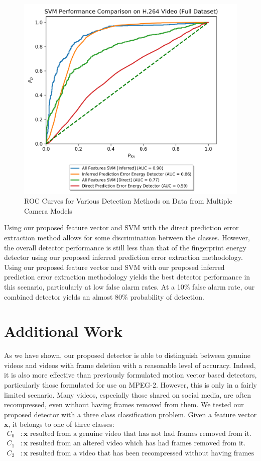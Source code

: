 \begin{figure}[htbp]
\centerline{\includegraphics[width=0.7\linewidth]{ExperimentalResults/full_ds_compare_roc.png}}
\caption{ROC Curves for Various Detection Methods on Data from Multiple Camera Models}
\label{fullDSSVM}
\end{figure}

Using our proposed feature vector and SVM with the direct prediction error extraction method allows for some discrimination between the classes. However, the overall detector performance is still less than that of the fingerprint energy detector using our proposed inferred prediction error extraction methodology. Using our proposed feature vector and SVM with our proposed inferred prediction error extraction methodology yields the best detector performance in this scenario, particularly at low false alarm rates. At a 10\% false alarm rate, our combined detector yields an almost 80\% probability of detection.

\section{Additional Work}

As we have shown, our proposed detector is able to distinguish between genuine videos and videos with frame deletion with a reasonable level of accuracy. Indeed, it is also more effective than previously formulated motion vector based detectors, particularly those formulated for use on MPEG-2. However, this is only in a fairly limited scenario. Many videos, especially those shared on social media, are often recompressed, even without having frames removed from them. We tested our proposed detector with a three class classification problem. Given a feature vector $\bm{x}$, it belongs to one of three classes:
\begin{equation}
\begin{aligned}
  C_{0} &: \bm{x} \text{ resulted from a genuine video that has not had frames removed from it.} \\
  C_{1} &: \bm{x} \text{ resulted from an altered video which has had frames removed from it.} \\
  C_{2} &: \bm{x} \text{ resulted from a video that has been recompressed without having frames removed.}
\end{aligned}
\end{equation}

